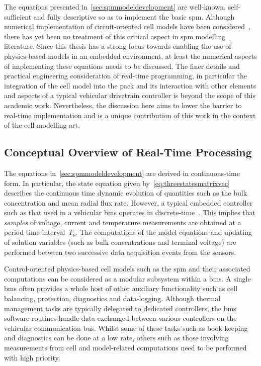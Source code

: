 
The  equations   presented  in~\cref{sec:spmmodeldevelopment}   are  well-known,
self-sufficient and  fully descriptive so  as to implement the  basic \gls{spm}.
Although  numerical implementation  of  circuit-oriented cell  models have  been
considered~\cite{Plett2004,Plett2004a,Plett2004b,Plett2006}, there  has yet been
no treatment  of this critical  aspect in \gls{spm} modelling  literature. Since
this thesis has a strong focus  towards enabling the use of physics-based models
in an embedded environment, at least the numerical aspects of implementing these
equations needs  to be  discussed. The finer  details and  practical engineering
consideration of  real-time programming,  in particular  the integration  of the
cell model into the pack and its  interaction with other elements and aspects of
a typical vehicular  drivetrain controller is beyond the scope  of this academic
work. Nevertheless, the  discussion here aims to lower the  barrier to real-time
implementation and is a  unique contribution of this work in  the context of the
cell modelling art.

\subsection{Conceptual Overview of Real-Time Processing}

The equations  in~\cref{sec:spmmodeldevelopment} are derived  in continuous-time
form. In particular, the  state equation given by~\cref{eq:threestatesmatrixvec}
describes  the  continuous   time  dynamic  evolution  of   quantities  such  as
the  bulk  concentration   and  mean  radial  flux  rate.   However,  a  typical
embedded  controller  such  as  that  used in  a  vehicular  \gls{bms}  operates
in   discrete-time~\cite{Andrea2010}.  This   implies  that   \emph{samples}  of
voltage,  current and  temperature measurements  are obtained  at a  period time
interval~$T_s$. The computations of the model equations and updating of solution
variables  (such as  bulk  concentrations and  terminal  voltage) are  performed
between two successive data acquisition events from the sensors.


Control-oriented  physics-based cell  models  such as  the  \gls{spm} and  their
associated  computations can  be  considered  as a  modular  subsystem within  a
\gls{bms}. A  single \gls{bms} often  provides a  whole host of  other auxiliary
functionality such as cell  balancing, protection, diagnostics and data-logging.
Although  thermal   management  tasks  are  typically   delegated  to  dedicated
controllers,  the  \gls{bms} software  routines  handle  data exchanged  between
various controllers  on the  vehicular communication bus.  Whilst some  of these
tasks such  as book-keeping and  diagnostics can be done  at a low  rate, others
such as  those involving measurements  from cell and  model-related computations
need to be performed with high priority.

